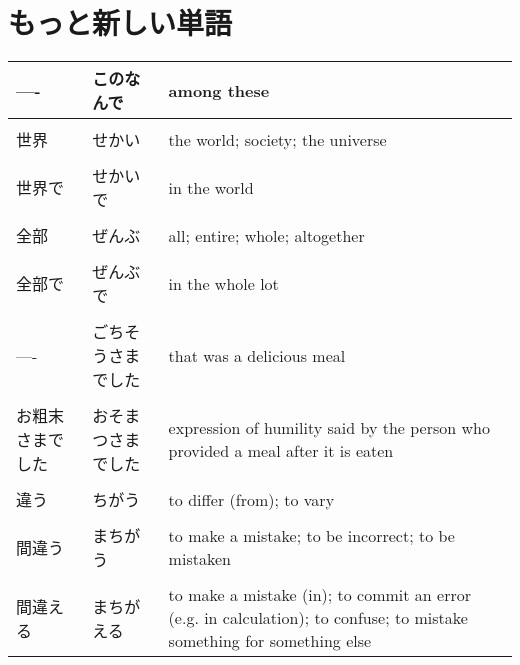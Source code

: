 \documentclass{article}
\begin{document}
\section{もっと新しい単語}
\begin{tabular}{ l | p{4cm} p{12cm} }
---- & このなんで & among these \\ \hline\\[-1em]
世界 & せかい & the world; society; the universe​ \\ \hline\\[-1em]
世界で & せかいで & in the world \\ \hline\\[-1em]
全部 & ぜんぶ & all; entire; whole; altogether​ \\ \hline\\[-1em]
全部で & ぜんぶで & in the whole lot \\ \hline\\[-1em]
---- & ごちそうさまでした & that was a delicious meal \\ \hline\\[-1em]
お粗末さまでした & おそまつさまでした & expression of humility said by the person who provided a meal after it is eaten \\ \hline\\[-1em]
違う & ちがう & to differ (from); to vary \\ \hline\\[-1em]
間違う & まちがう & to make a mistake; to be incorrect; to be mistaken​ \\ \hline\\[-1em]
間違える & まちがえる & to make a mistake (in); to commit an error (e.g. in calculation)​; to confuse; to mistake something for something else​ %
\end{tabular}
\end{document}
